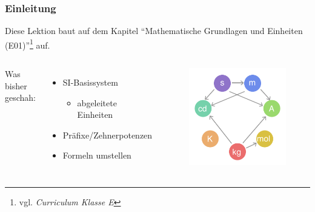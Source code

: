 \begin{frame}
  \frametitle{Einleitung}

  Diese Lektion baut auf dem Kapitel ``Mathematische Grundlagen und Einheiten
  (E01)''\footnote{vgl. \emph{Curriculum Klasse E}\hyperlink{refs}{\cite{curr}}} auf.

  \begin{columns}[c]
    Was bisher geschah: \\[1em]
    \begin{itemize}
      \item SI-Basissystem
        \begin{itemize}
          \item abgeleitete Einheiten
        \end{itemize}
      \item Präfixe/Zehnerpotenzen
      \item Formeln umstellen
    \end{itemize}
    \begin{center}
      \begin{figure}
        \includegraphics[width=.8\textwidth,height=.55\textheight,keepaspectratio]{e01/SI_base_unit.png}
      \end{figure}
    \end{center}
  \end{columns}

\end{frame}

